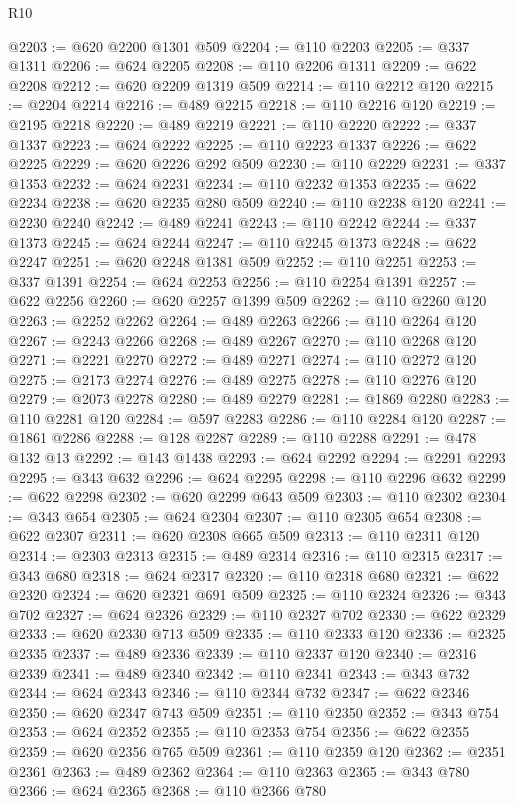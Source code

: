 \begin{lexlean}{R10}
\begin{coremodule}
@2203 := @620 @2200 @1301 @509
@2204 := @110 @2203
@2205 := @337 @1311
@2206 := @624 @2205
@2208 := @110 @2206 @1311
@2209 := @622 @2208
@2212 := @620 @2209 @1319 @509
@2214 := @110 @2212 @120
@2215 := @2204 @2214
@2216 := @489 @2215
@2218 := @110 @2216 @120
@2219 := @2195 @2218
@2220 := @489 @2219
@2221 := @110 @2220
@2222 := @337 @1337
@2223 := @624 @2222
@2225 := @110 @2223 @1337
@2226 := @622 @2225
@2229 := @620 @2226 @292 @509
@2230 := @110 @2229
@2231 := @337 @1353
@2232 := @624 @2231
@2234 := @110 @2232 @1353
@2235 := @622 @2234
@2238 := @620 @2235 @280 @509
@2240 := @110 @2238 @120
@2241 := @2230 @2240
@2242 := @489 @2241
@2243 := @110 @2242
@2244 := @337 @1373
@2245 := @624 @2244
@2247 := @110 @2245 @1373
@2248 := @622 @2247
@2251 := @620 @2248 @1381 @509
@2252 := @110 @2251
@2253 := @337 @1391
@2254 := @624 @2253
@2256 := @110 @2254 @1391
@2257 := @622 @2256
@2260 := @620 @2257 @1399 @509
@2262 := @110 @2260 @120
@2263 := @2252 @2262
@2264 := @489 @2263
@2266 := @110 @2264 @120
@2267 := @2243 @2266
@2268 := @489 @2267
@2270 := @110 @2268 @120
@2271 := @2221 @2270
@2272 := @489 @2271
@2274 := @110 @2272 @120
@2275 := @2173 @2274
@2276 := @489 @2275
@2278 := @110 @2276 @120
@2279 := @2073 @2278
@2280 := @489 @2279
@2281 := @1869 @2280
@2283 := @110 @2281 @120
@2284 := @597 @2283
@2286 := @110 @2284 @120
@2287 := @1861 @2286
@2288 := @128 @2287
@2289 := @110 @2288
@2291 := @478 @132 @13
@2292 := @143 @1438
@2293 := @624 @2292
@2294 := @2291 @2293
@2295 := @343 @632
@2296 := @624 @2295
@2298 := @110 @2296 @632
@2299 := @622 @2298
@2302 := @620 @2299 @643 @509
@2303 := @110 @2302
@2304 := @343 @654
@2305 := @624 @2304
@2307 := @110 @2305 @654
@2308 := @622 @2307
@2311 := @620 @2308 @665 @509
@2313 := @110 @2311 @120
@2314 := @2303 @2313
@2315 := @489 @2314
@2316 := @110 @2315
@2317 := @343 @680
@2318 := @624 @2317
@2320 := @110 @2318 @680
@2321 := @622 @2320
@2324 := @620 @2321 @691 @509
@2325 := @110 @2324
@2326 := @343 @702
@2327 := @624 @2326
@2329 := @110 @2327 @702
@2330 := @622 @2329
@2333 := @620 @2330 @713 @509
@2335 := @110 @2333 @120
@2336 := @2325 @2335
@2337 := @489 @2336
@2339 := @110 @2337 @120
@2340 := @2316 @2339
@2341 := @489 @2340
@2342 := @110 @2341
@2343 := @343 @732
@2344 := @624 @2343
@2346 := @110 @2344 @732
@2347 := @622 @2346
@2350 := @620 @2347 @743 @509
@2351 := @110 @2350
@2352 := @343 @754
@2353 := @624 @2352
@2355 := @110 @2353 @754
@2356 := @622 @2355
@2359 := @620 @2356 @765 @509
@2361 := @110 @2359 @120
@2362 := @2351 @2361
@2363 := @489 @2362
@2364 := @110 @2363
@2365 := @343 @780
@2366 := @624 @2365
@2368 := @110 @2366 @780

\end{coremodule}
\end{lexlean}
